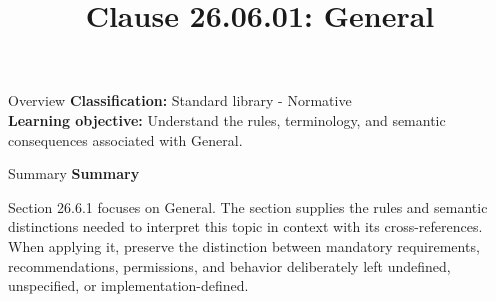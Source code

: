 \documentclass[10pt,letterpaper]{article}
\title{Clause 26.06.01: General}
\author{}
\date{}
\begin{document}
\maketitle
\begin{CornellOverviewBox}{Overview}
\textbf{Classification:} Standard library - Normative\\[2pt]
\textbf{Learning objective:} Understand the rules, terminology, and semantic consequences associated with General.
\end{CornellOverviewBox}\begin{CornellSummaryBox}{Summary}
{\sffamily\bfseries\color{Accent} Summary}\par\vspace{3pt}Section 26.6.1 focuses on General. The section supplies the rules and semantic distinctions needed to interpret this topic in context with its cross-references. When applying it, preserve the distinction between mandatory requirements, recommendations, permissions, and behavior deliberately left undefined, unspecified, or implementation-defined.
\end{CornellSummaryBox}
\end{document}
